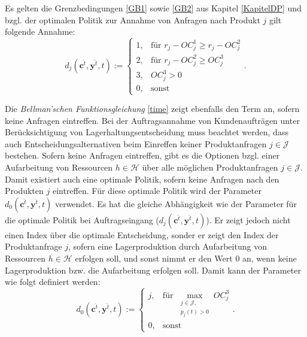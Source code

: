 Es gelten die Grenzbedingungen \eqref{GB1} sowie \eqref{GB2} aus Kapitel \ref{KapitelDP} und bzgl. der optimalen Politik zur Annahme von Anfragen nach Produkt $j$ gilt folgende Annahme:
\begin{equation}\label{GB3}
     d_{j}({\textbf{c}^{\hat t},\textbf{y}^{\hat t}, t}):=\left\{\begin{array}{llll}
     1, & \text{für } r_{j} - OC_{j}^{1} \ge r_{j} - OC_{j}^{2}\\
         2, & \text{für } r_{j} - OC_{j}^{2} \ge OC_{j}^{3}\\
         3, & OC_{j}^{3} > 0\\
         0, & \text{sonst}\end{array}\right. .
\end{equation}

Die \textit{Bellman'schen Funktionsgleichung} \eqref{time} zeigt ebenfalls den Term an, sofern keine Anfragen eintreffen. Bei der Auftragsannahme von Kundenaufträgen unter Berücksichtigung von Lagerhaltungsentscheidung muss beachtet werden, dass auch Entscheidungsalternativen beim Einreffen keiner Produktanfragen $j\in\mathcal{J} $ bestehen. Sofern keine Anfragen eintreffen, gibt es die Optionen bzgl. einer Aufarbeitung von Ressourcen $h\in\mathcal{H}$ über alle möglichen Produktanfragen $j\in\mathcal{J}$. Damit existiert auch eine optimale Politik, sofern keine Anfragen nach den Produkten $j$ eintreffen. Für diese optimale Politik wird der Parameter $d_0({\textbf{c}^{\hat t},\textbf{y}^{\hat t},t})$ verwendet. Es hat die gleiche Abhängigkeit wie der Parameter für die optimale Politik bei Auftragseingang ($d_j({\textbf{c}^{\hat t},\textbf{y}^{\hat t},t})$). Er zeigt jedoch nicht einen Index über die optimale Entscheidung, sonder er zeigt den Index der Produktanfrage $j$, sofern eine Lagerproduktion durch Aufarbeitung von Ressourcen $h\in\mathcal{H}$ erfolgen soll, und sonst nimmt er den Wert $0$ an, wenn keine Lagerproduktion bzw. die Aufarbeitung erfolgen soll. Damit kann der Parameter wie folgt definiert werden:
\begin{equation}\label{GB4}
     d_{0}({\textbf{c}^{\hat t},\textbf{y}^{\hat t}, t}):=\left\{\begin{array}{ll}
         j, & \text{für }\max_{\substack{j\in \mathcal{J},\\ p_j(t)>0}} OC_{j}^{3}\\
         0, & \text{sonst}\end{array}\right. .
\end{equation}

